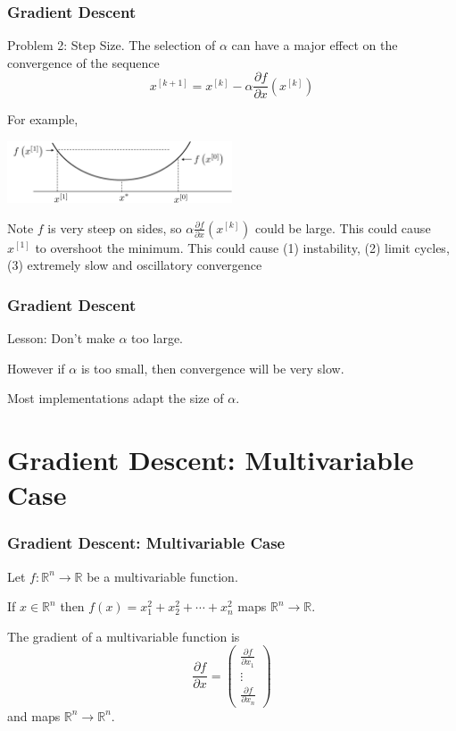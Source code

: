 \documentclass{beamer}
\begin{document}
\begin{frame}\frametitle{Gradient Descent}
	{\color{blue}Problem 2: Step Size.}
	The selection of $\alpha$ can have a major effect on the convergence of the sequence
	\[ 
		x^{[k+1]} = x^{[k]} - \alpha \frac{\partial f}{\partial x}(x^{[k]}) 
	\]
	
	For example,
	\begin{center}
		\includegraphics[width=0.5\textwidth]
			{figures/chap14_quadratic}
	\end{center}
	Note $f$ is very steep on sides, so $\alpha \frac{\partial f}{\partial x}(x^{[k]})$ could be large.  This could cause $x^{[1]}$ to overshoot the minimum.  This could cause (1) instability, (2) limit cycles, (3) extremely slow and oscillatory convergence	
\end{frame}

\begin{frame}\frametitle{Gradient Descent}

	{\color{blue}Lesson:}  
		Don't make $\alpha$ too large.
		
	\vfill
	
	However if $\alpha$ is too small, then convergence will be very slow.
	
	\vfill
	
	Most implementations adapt the size of $\alpha$.
\end{frame}

\section{Gradient Descent: Multivariable Case}
\frame{\sectionpage}

\begin{frame}\frametitle{Gradient Descent: Multivariable Case}
	Let $f:\mathbb{R}^n\to\mathbb{R}$ be a multivariable function.
	\begin{example}
		If $x \in \mathbb{R}^n$ then 
		$f(x) = x_1^2 + x_2^2 + \cdots + x_n^2$ maps $\mathbb{R}^n\to\mathbb{R}$.	
	\end{example}
	The gradient of a multivariable function is
	\[ 
		\frac{\partial  f}{\partial  x} = \begin{pmatrix}
	    \frac{\partial  f}{\partial  x_1}\\
	    \vdots\\
	    \frac{\partial  f}{\partial  x_n}
	  \end{pmatrix} 
	\] 
	and maps $\mathbb{R}^n \to \mathbb{R}^n$.
\end{frame}
\end{document}
